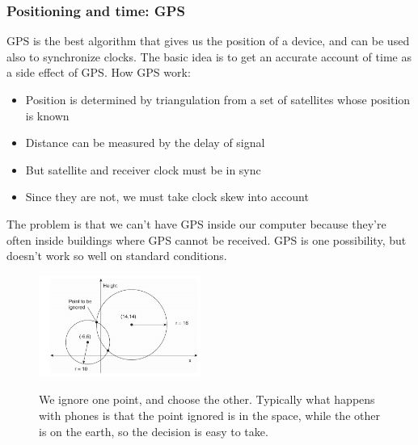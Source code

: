 \documentclass[10pt,a4paper]{article}
\begin{document}
\subsubsection{Positioning and time: GPS}
GPS is the best algorithm that gives us the position of a device, and can be used also to synchronize clocks.
The basic idea is to get an accurate account of time as a side effect of GPS. How GPS work:
\begin{itemize}
	\item Position is determined by triangulation from a set of satellites whose position is known
	\item Distance can be measured by the delay of signal
	\item But satellite and receiver clock must be in sync
	\item Since they are not, we must take clock skew into account
\end{itemize}
The problem is that we can't have GPS inside our computer because they're often inside buildings where GPS cannot be received. GPS is one possibility, but doesn't work so well on standard conditions. \\
\begin{figure}[h!]
 \hfill \includegraphics[width=150pt]{images/gps.png}\hspace*{\fill}
  \label{fig:gps}
  \caption{We ignore one point, and choose the other. Typically what happens with phones is that the point ignored is in the space, while the other is on the earth, so the decision is easy to take.}
\end{figure}
\end{document}

